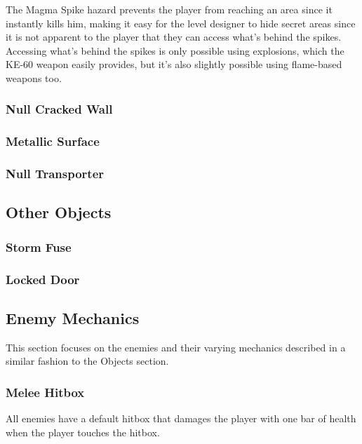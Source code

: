 \documentclass[12pt]{article}
\begin{document}
The Magma Spike hazard prevents the player from reaching an area since it instantly kills him, making it easy for the level designer to hide secret areas since it is not apparent to the player that they can access what's behind the spikes. Accessing what's behind the spikes is only possible using explosions, which the KE-60 weapon easily provides, but it's also slightly possible using flame-based weapons too. 

\subsubsection{Null Cracked Wall}

\subsubsection{Metallic Surface}

\subsubsection{Null Transporter}

\subsection{Other Objects}

\subsubsection{Storm Fuse}

\subsubsection{Locked Door}

\subsection{Enemy Mechanics}

This section focuses on the enemies and their varying mechanics described in a similar fashion to the Objects section. 

\subsubsection{Melee Hitbox}

All enemies have a default hitbox that damages the player with one bar of health when the player touches the hitbox. 
\end{document}
